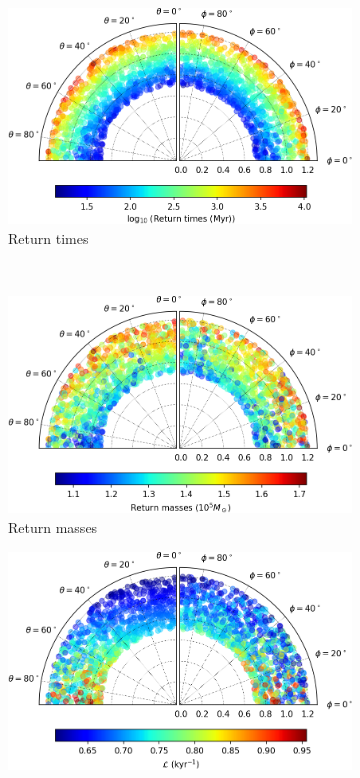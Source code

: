 \begin{figure}[h]
    \centering
    \begin{subfigure}[t]{0.4\textwidth}
        \includegraphics[width = \textwidth]{"../Files/Week 13/images/6_time"}
        \caption{Return times}
    \end{subfigure}
    ~ 
    \begin{subfigure}[t]{0.4\textwidth}
        \includegraphics[width=\textwidth]{"../Files/Week 13/images/6_mass"}
        \caption{Return masses}
    \end{subfigure}
    \begin{subfigure}[t]{0.4\textwidth}
        \includegraphics[width=\textwidth]{"../Files/Week 13/images/6_lyapunov"}

\end{subfigure}
\end{figure}
